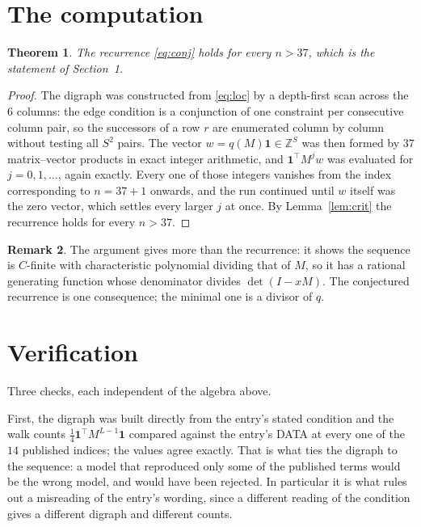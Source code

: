 \documentclass[11pt,a4paper]{article}
\theoremstyle{plain}
\newtheorem{theorem}{Theorem}
\theoremstyle{definition}
\newtheorem{remark}[theorem]{Remark}
\begin{document}
\section{The computation}

\begin{theorem}
The recurrence \eqref{eq:conj} holds for every $n>37$, which is the statement of
Section~1.
\end{theorem}

\begin{proof}
The digraph was constructed from \eqref{eq:loc} by a depth-first scan across the $6$
columns: the edge condition is a conjunction of one constraint per consecutive column
pair, so the successors of a row $r$ are enumerated column by column without testing all
$S^2$ pairs. The vector $w=q(M)\mathbf{1}\in\mathbb{Z}^{S}$ was then formed by $37$
matrix--vector products in exact integer arithmetic, and $\mathbf{1}^{\!\top}M^{j}w$ was
evaluated for $j=0,1,\dots$, again exactly. Every one of those integers vanishes from the
index corresponding to $n=37+1$ onwards, and the run continued until $w$ itself was the
zero vector, which settles every larger $j$ at once. By Lemma~\ref{lem:crit} the recurrence
holds for every $n>37$.
\end{proof}

\begin{remark}
The argument gives more than the recurrence: it shows the sequence is $C$-finite with
characteristic polynomial dividing that of $M$, so it has a rational generating function
whose denominator divides $\det(I-xM)$. The conjectured recurrence is one consequence; the
minimal one is a divisor of $q$.
\end{remark}

\section{Verification}

Three checks, each independent of the algebra above.

First, the digraph was built directly from the entry's stated condition and the walk counts
$\tfrac1{4}\mathbf{1}^{\!\top}M^{L-1}\mathbf{1}$ compared against the entry's DATA at
every one of the $14$ published indices; the values agree exactly. That is what ties
the digraph to the sequence: a model that reproduced only some of the published terms would
be the wrong model, and would have been rejected. In particular it is what rules out a
misreading of the entry's wording, since a different reading of the condition gives a
different digraph and different counts.
\end{document}
